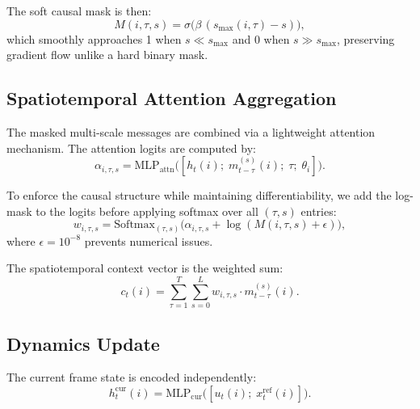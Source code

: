\documentclass[10pt,twocolumn]{article}
\begin{document}
The soft causal mask is then:
\begin{equation}\label{eq:mask}
    M(i,\tau,s) = \sigma\!\big(\beta\,(s_{\max}(i,\tau) - s)\big),
\end{equation}
which smoothly approaches 1 when $s \ll s_{\max}$ and 0 when $s \gg s_{\max}$, preserving gradient flow unlike a hard binary mask.

\subsection{Spatiotemporal Attention Aggregation}

The masked multi-scale messages are combined via a lightweight attention mechanism. The attention logits are computed by:
\begin{equation}
    \alpha_{i,\tau,s} = \mathrm{MLP}_{\mathrm{attn}}\!\big([h_t(i);\; m^{(s)}_{t-\tau}(i);\; \tau;\; \theta_i]\big).
\end{equation}

To enforce the causal structure while maintaining differentiability, we add the log-mask to the logits before applying softmax over all $(\tau, s)$ entries:
\begin{equation}\label{eq:attention}
    w_{i,\tau,s} = \mathrm{Softmax}_{(\tau,s)}\!\big(\alpha_{i,\tau,s} + \log(M(i,\tau,s) + \epsilon)\big),
\end{equation}
where $\epsilon = 10^{-8}$ prevents numerical issues.

The spatiotemporal context vector is the weighted sum:
\begin{equation}\label{eq:context}
    c_t(i) = \sum_{\tau=1}^{T} \sum_{s=0}^{L} w_{i,\tau,s} \cdot m^{(s)}_{t-\tau}(i).
\end{equation}

\subsection{Dynamics Update}

The current frame state is encoded independently:
\begin{equation}
    h_t^{\mathrm{cur}}(i) = \mathrm{MLP}_{\mathrm{cur}}\!\big([u_t(i);\; x^{\mathrm{ref}}_t(i)]\big).
\end{equation}
\end{document}
